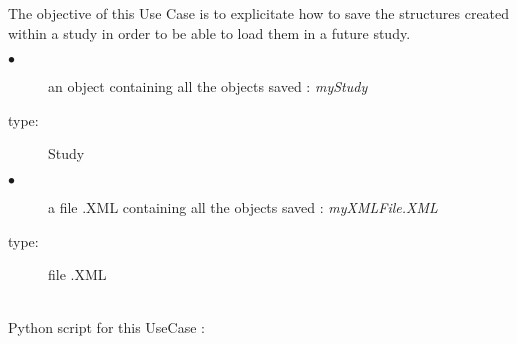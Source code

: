 \renewcommand{\filename}{docUC_LoadSave_Save.tex}
\renewcommand{\filetitle}{UC : How to save a study ?}

\HeaderIILevel

The objective of this Use Case is to explicitate how to save the structures created within a study in order to be able to load them in a future study.\\


             {
               \begin{description}
               \item[$\bullet$] an object containing all the objects saved : {\itshape myStudy}
               \item[type:] Study
               \item[$\bullet$]  a file .XML containing all the objects saved : {\itshape myXMLFile.XML}
               \item[type:] file .XML
               \end{description}
             }

             \textspace\\
             Python  script for this UseCase :

